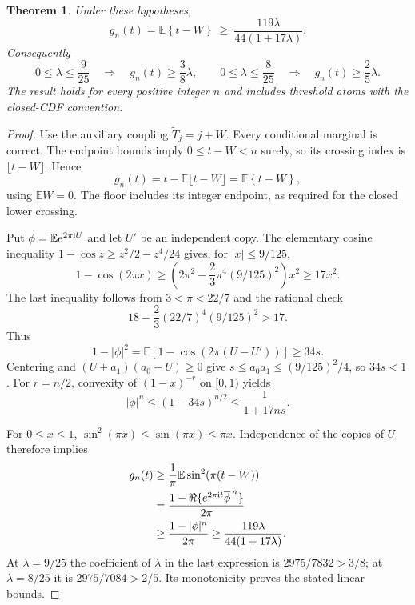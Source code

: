 \documentclass[11pt,a4paper]{article}
\newcommand{\E}{\mathbb E}\newcommand{\Pp}{\mathbb P}
\newcommand{\fracpart}[1]{\left\{#1\right\}}
\newtheorem{theorem}{Theorem}\newtheorem{proposition}[theorem]{Proposition}
\begin{document}
\begin{theorem}\label{thm:common}
Under these hypotheses,
\begin{equation}\label{eq:bound}
 g_n(t)=\E\fracpart{t-W}
 \ \ge\ \frac{119\lambda}{44(1+17\lambda)}.
\end{equation}
Consequently
\[
 0\le\lambda\le\frac9{25}\quad\Longrightarrow\quad
       g_n(t)\ge\frac38\lambda,
 \qquad
 0\le\lambda\le\frac8{25}\quad\Longrightarrow\quad
       g_n(t)\ge\frac25\lambda.
\]
The result holds for every positive integer $n$ and includes threshold
atoms with the closed-CDF convention.
\end{theorem}
\begin{proof}
Use the auxiliary coupling $\widetilde T_j=j+W$. Every conditional
marginal is correct. The endpoint bounds imply $0\le t-W<n$ surely, so its
crossing index is $\lfloor t-W\rfloor$. Hence
\[
 g_n(t)=t-\E\lfloor t-W\rfloor
       =\E\fracpart{t-W},
\]
using $\E W=0$. The floor includes its integer endpoint, as required for
the closed lower crossing.

Put $\phi=\E e^{2\pi{\rm i}U}$ and let $U'$ be an independent copy.
The elementary cosine inequality
$1-\cos z\ge z^2/2-z^4/24$ gives, for $|x|\le9/125$,
\[
 1-\cos(2\pi x)
 \ge\left(2\pi^2-\frac23\pi^4(9/125)^2\right)x^2
 \ge17x^2.
\]
The last inequality follows from $3<\pi<22/7$ and the rational check
\begin{equation}\label{eq:constant}
 18-\frac23(22/7)^4(9/125)^2>17.
\end{equation}
Thus
\[
 1-|\phi|^2=\E[1-\cos(2\pi(U-U'))]\ge34s.
\]
Centering and $(U+a_1)(a_0-U)\ge0$ give
$s\le a_0a_1\le(9/125)^2/4$, so $34s<1$.
For $r=n/2$, convexity of $(1-x)^{-r}$ on $[0,1)$ yields
\[
 |\phi|^n\le(1-34s)^{n/2}\le\frac1{1+17ns}.
\]

For $0\le x\le1$, $\sin^2(\pi x)\le\sin(\pi x)\le\pi x$.
Independence of the copies of $U$ therefore implies
\begin{align*}
 g_n(t)&\ge\frac1\pi\E\sin^2(\pi(t-W))\\
       &=\frac{1-\Re\{e^{2\pi{\rm i}t}\overline{\phi}^{\,n}\}}{2\pi}\\
       &\ge\frac{1-|\phi|^n}{2\pi}
        \ge\frac{119\lambda}{44(1+17\lambda)}.
\end{align*}
At $\lambda=9/25$ the coefficient of $\lambda$ in the last expression
is $2975/7832>3/8$; at $\lambda=8/25$ it is
$2975/7084>2/5$. Its monotonicity proves the stated linear bounds.
\end{proof}
\end{document}
